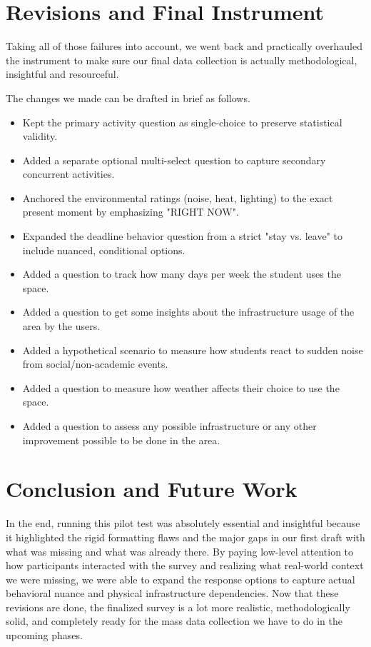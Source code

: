 \documentclass[12pt, a4paper]{report}
\begin{document}
\chapter{Revisions and Final Instrument}
Taking all of those failures into account, we went back and practically overhauled the instrument to make sure our final data collection is actually methodological, insightful and resourceful.

The changes we made can be drafted in brief as follows.

\begin{itemize}
\item Kept the primary activity question as single-choice to preserve statistical validity.
\item Added a separate optional multi-select question to capture secondary concurrent activities.
\item Anchored the environmental ratings (noise, heat, lighting) to the exact present moment by emphasizing "RIGHT NOW".
\item Expanded the deadline behavior question from a strict "stay vs. leave" to include nuanced, conditional options.
\item Added a question to track how many days per week the student uses the space.
\item Added a question to get some insights about the infrastructure usage of the area by the users.
\item Added a hypothetical scenario to measure how students react to sudden noise from social/non-academic events.
\item Added a question to measure how weather affects their choice to use the space.
\item Added a question to assess any possible infrastructure or any other improvement possible to be done in the area.

\end{itemize}

\chapter{Conclusion and Future Work}
In the end, running this pilot test was absolutely essential and insightful because it highlighted the rigid formatting flaws and the major gaps in our first draft with what was missing and what was already there. By paying low-level attention to how participants interacted with the survey and realizing what real-world context we were missing, we were able to expand the response options to capture actual behavioral nuance and physical infrastructure dependencies. Now that these revisions are done, the finalized survey is a lot more realistic, methodologically solid, and completely ready for the mass data collection we have to do in the upcoming phases.
\end{document}
